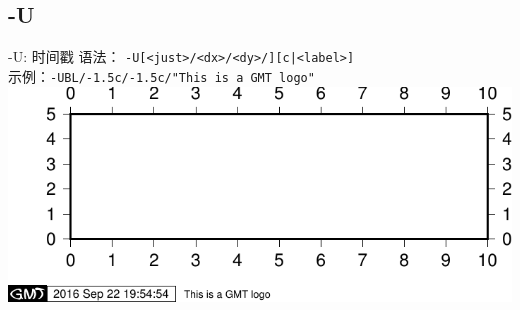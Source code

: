 \documentclass[UTF8, 11pt]{ctexbeamer}
\begin{document}
\subsection{-U}
\begin{frame}[fragile]{-U: 时间戳}
语法： \verb!-U[<just>/<dx>/<dy>/][c|<label>]! \\

示例：\verb!-UBL/-1.5c/-1.5c/"This is a GMT logo"! \\[0.5cm]
\includegraphics[width=\textwidth]{GMT_-U}
\end{frame}
\end{document}
